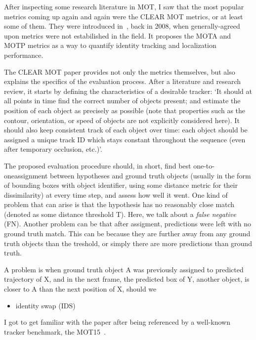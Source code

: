 After inspecting some research literature in MOT, I saw that the most popular metrics coming up again and again were the CLEAR MOT metrics, or at least some of them. They were introduced in~\cite{Bernardin2008}, back in 2008, when generally-agreed upon metrics were not estabilished in the field. It proposes the MOTA and MOTP metrics as a way to quantify identity tracking and localization performance.

The CLEAR MOT paper provides not only the metrics themselves, but also explains the specifics of the evaluation process. After a literature and research review, it starts by defining the characteristics of a desirable tracker: `It should at all points in time find the correct number of objects present; and estimate the position of each object as precisely as possible (note that properties such as the contour, orientation, or speed of objects are not explicitly considered here). It should also keep consistent track of each object over time: each object should be assigned a unique track ID which stays constant throughout the sequence (even after temporary occlusion, etc.)'.

The proposed evaluation procedure should, in short, find best one-to-oneassignment between hypotheses and ground truth objects (usually in the form of bounding boxes with object identifier, using some distance metric for their dissimilarity) at every time step, and assess how well it went. One kind of problem that can arise is that the hypothesis has no reasonably close match (denoted as some distance threshold T). Here, we talk about a \textit{false negative} (FN). Another problem can be that after assigment, predictions were left with no ground truth match. This can be because they are further away from any ground truth objects than the treshold, or simply there are more predictions than ground truth.

A problem is when ground truth object A was previously assigned to predicted trajectory of X, and in the next frame, the predicted box of Y, another object, is closer to A than the next position of X, should we 

\begin{itemize}
    \item identity swap (IDS)
\end{itemize}

I got to get familiar with the paper after being referenced by a well-known tracker benchmark, the MOT15~\cite{MOT15}.


